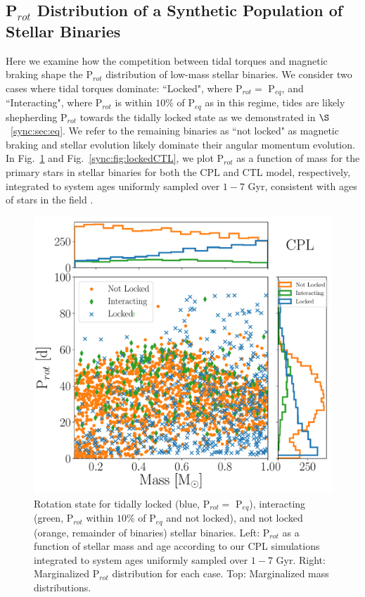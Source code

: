 \subsection{P$_{rot}$ Distribution of a Synthetic Population of Stellar Binaries} \label{sync:sec:protDist}

Here we examine how the competition between tidal torques and magnetic braking shape the P$_{rot}$ distribution of low-mass stellar binaries.  We consider two cases where tidal torques dominate: ``Locked", where P$_{rot} = $ P$_{eq}$, and ``Interacting", where P$_{rot}$ is within $10\%$ of P$_{eq}$ as in this regime, tides are likely shepherding P$_{rot}$ towards the tidally locked state as we demonstrated in $\S$~\ref{sync:sec:eq}. We refer to the remaining binaries as ``not locked" as magnetic braking and stellar evolution likely dominate their angular momentum evolution.  In Fig.~\ref{sync:fig:lockedCPL} and Fig.~\ref{sync:fig:lockedCTL}, we plot P$_{rot}$ as a function of mass for the primary stars in stellar binaries for both the CPL and CTL model, respectively, integrated to system ages uniformly sampled over $1-7$ Gyr, consistent with ages of stars in the \kepler field \citep{Chaplin2014}.  

\begin{figure}
	\includegraphics[width=\columnwidth]{lockedCPL.pdf}
   \caption{Rotation state for tidally locked (blue, P$_{rot} = $ P$_{eq}$), interacting (green, P$_{rot}$ within $10\%$ of P$_{eq}$ and not locked), and not locked (orange, remainder of binaries) stellar binaries. Left: P$_{rot}$ as a function of stellar mass and age according to our CPL simulations integrated to system ages uniformly sampled over $1-7$ Gyr. Right: Marginalized P$_{rot}$ distribution for each case. Top: Marginalized mass distributions.}%
    \label{sync:fig:lockedCPL}%
\end{figure}

